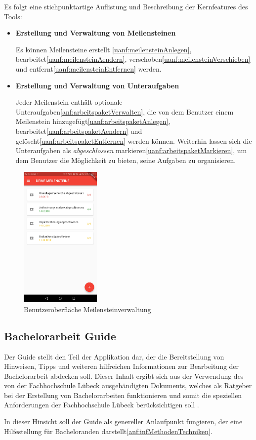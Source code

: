 \documentclass[bibliography=totoc,listof=totoc,BCOR=5mm,DIV=12,oneside]{scrbook}
\begin{document}
\par\bigskip Es folgt eine stichpunktartige Auflistung und Beschreibung der Kernfeatures des Tools:
\begin{itemize}
\item \textbf{Erstellung und Verwaltung von Meilensteinen}
\par Es können Meilensteine erstellt \ref{uanf:meilensteinAnlegen}, bearbeitet\ref{uanf:meilensteinAendern}, verschoben\ref{uanf:meilensteinVerschieben} und entfernt\ref{uanf:meilensteinEntfernen} werden. 
\item \textbf{Erstellung und Verwaltung von Unteraufgaben}
\par Jeder Meilenstein enthält optionale Unteraufgaben\ref{anf:arbeitspaketVerwalten}, die von dem Benutzer einem Meilenstein hinzugefügt\ref{uanf:arbeitspaketAnlegen}, bearbeitet\ref{uanf:arbeitspaketAendern} und gelöscht\ref{uanf:arbeitspaketEntfernen} werden können. Weiterhin lassen sich die Unteraufgaben als \textit{abgeschlossen} markieren\ref{uanf:arbeitspaketMarkieren}, um dem Benutzer die Möglichkeit zu bieten, seine Aufgaben zu organisieren.
\end{itemize}

\bigskip
\begin{figure}[H]
	\centering
	\includegraphics[width=0.35\textwidth, keepaspectratio]{Bilder/Prototyp/app_screenshots/MeilensteinOverviewScreenshot.jpg}
	\caption{Benutzeroberfläche Meilensteinverwaltung}
	\label{img:fortschrittsmanagement}
\end{figure}

\newpage
\subsection{Bachelorarbeit Guide}
\par Der Guide stellt den Teil der Applikation dar, der die Bereitstellung von Hinweisen, Tipps und weiteren hilfreichen Informationen zur Bearbeitung der Bachelorarbeit abdecken soll. Dieser Inhalt ergibt sich aus der Verwendung des von der Fachhochschule Lübeck ausgehändigten Dokuments, welches als Ratgeber bei der Erstellung von Bachelorarbeiten funktionieren und somit die speziellen Anforderungen der Fachhochschule Lübeck berücksichtigen soll \citep[vgl. Kapitel 1]{FHLuebeckBAAnleitung}.
\par \bigskip In dieser Hinsicht soll der Guide als genereller Anlaufpunkt fungieren, der eine Hilfestellung für Bacheloranden darstellt\ref{anf:infMethodenTechniken}.
\end{document}
